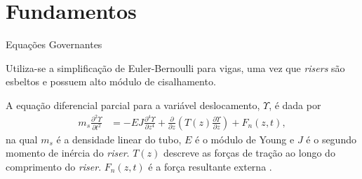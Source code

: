 \documentclass[10pt]{beamer}
\begin{document}
\section{Fundamentos}

\begin{frame}[fragile]{Equações Governantes}

\begin{block}{}
Utiliza-se a simplificação de Euler-Bernoulli para vigas, uma vez que \textit{risers} são esbeltos e possuem alto módulo de cisalhamento.
\end{block}

\begin{block}{}
A equação diferencial parcial para a variável deslocamento, $\Upsilon$, é dada por \begin{align}
	m_s \frac{\partial^2 \Upsilon}{\partial t^2} &= -E J	\frac{\partial^4 \Upsilon}{\partial z^4} + \frac{\partial}{\partial z}\left(T(z) \frac{\partial \Upsilon}{\partial z}\right) + F_n(z,t),
\end{align} na qual $m_s$ é a densidade linear do tubo, $E$ é o módulo de Young e $J$ é o segundo momento de inércia do \textit{riser}. $T(z)$ descreve as forças de tração ao longo do comprimento do \textit{riser}. $F_n(z,t)$ é a força resultante externa \cite{fabricioIFAC}.
\end{block}

\end{frame}
\end{document}

